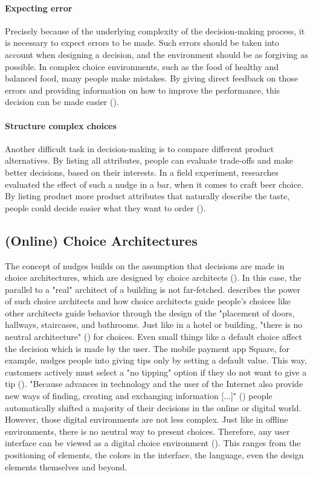 \paragraph{Expecting error}
Precisely because of the underlying complexity of the decision-making process, it is necessary to expect errors to be made. Such errors should be taken into account when designing a decision, and the environment should be as forgiving as possible. In complex choice environments, such as the food of healthy and balanced food, many people make mistakes. By giving direct feedback on those errors and providing information on how to improve the performance, this decision can be made easier (\cite{guthrie_nudging_2015}).
\paragraph{Structure complex choices}
Another difficult task in decision-making is to compare different product alternatives. By listing all attributes, people can evaluate trade-offs and make better decisions, based on their interests. In a field experiment, researches evaluated the effect of such a nudge in a bar, when it comes to craft beer choice. By listing product more product attributes that naturally describe the taste, people could decide easier what they want to order (\cite{malone_excessive_2017}).


\subsection{(Online) Choice Architectures}
The concept of nudges builds on the assumption that decisions are made in choice architectures, which are designed by choice architects (\cite{thaler_nudge:_2009}). In this case, the parallel to a "real" architect of a building is not far-fetched. \cite{johnson_beyond_2012} describes the power of such choice architects and how choice architects guide people's choices like other architects guide behavior through the design of the "placement of doors, hallways, staircases, and bathrooms. Just like in a hotel or building, "there is no neutral architecture" (\cite{johnson_beyond_2012}) for choices. Even small things like a default choice affect the decision which is made by the user. The mobile payment app Square, for example, nudges people into giving tips only by setting a default value. This way, customers actively must select a "no tipping" option if they do not want to give a tip (\cite{weinmann_digital_2016}). "Because advances in technology and the user of the Internet also provide new ways of finding, creating and exchanging information [...]" (\cite{broniarczyk_decision_2014}) people automatically shifted a majority of their decisions in the online or digital world. However, those digital environments are not less complex. Just like in offline environments, there is no neutral way to present choices. Therefore, any user interface can be viewed as a digital choice environment (\cite{schneider_digital_2018}). This ranges from the positioning of elements, the colors in the interface, the language, even the design elements themselves and beyond.

